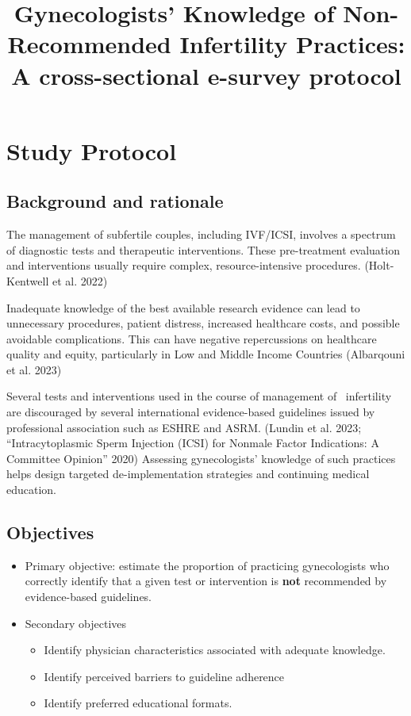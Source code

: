 \documentclass[
  letterpaper,
  DIV=11,
  numbers=noendperiod]{scrartcl}
\title{Gynecologists' Knowledge of Non-Recommended Infertility
Practices: A cross-sectional e-survey protocol}
\author{}
\date{}
\begin{document}
\maketitle


\section{Study Protocol}\label{study-protocol}

\subsection{Background and rationale}\label{background-and-rationale}

The management of subfertile couples, including IVF/ICSI, involves a
spectrum of diagnostic tests and therapeutic interventions. These
pre-treatment evaluation and interventions usually require complex,
resource-intensive procedures. (Holt-Kentwell et al. 2022)

Inadequate knowledge of the best available research evidence can lead to
unnecessary procedures, patient distress, increased healthcare costs,
and possible avoidable complications. This can have negative
repercussions on healthcare quality and equity, particularly in Low and
Middle Income Countries (Albarqouni et al. 2023)

Several tests and interventions used in the course of management of
~infertility are discouraged by several international evidence-based
guidelines issued by professional association such as ESHRE and ASRM.
(Lundin et al. 2023; {``Intracytoplasmic Sperm Injection (ICSI) for
Non{\textendash}male Factor Indications: A Committee Opinion''} 2020)
Assessing gynecologists' knowledge of such practices helps design
targeted de-implementation strategies and continuing medical education.

\subsection{Objectives}\label{objectives}

\begin{itemize}
\item
  Primary objective: estimate the proportion of practicing gynecologists
  who correctly identify that a given test or intervention is
  \textbf{not} recommended by evidence-based guidelines.
\item
  Secondary objectives

  \begin{itemize}
  \item
    Identify physician characteristics associated with adequate
    knowledge.
  \item
    Identify perceived barriers to guideline adherence
  \item
    Identify preferred educational formats.
  \end{itemize}
\end{itemize}
\end{document}
